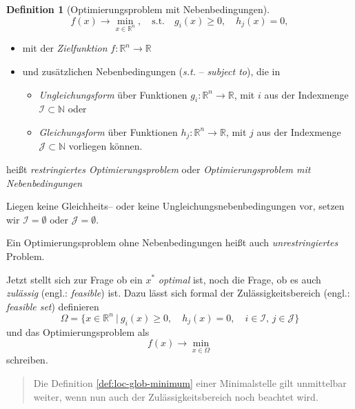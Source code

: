 \documentclass[]{book}
\providecommand{\tightlist}{%
  \setlength{\itemsep}{0pt}\setlength{\parskip}{0pt}}
\newenvironment {JHSAYS} [0] {\begin{quote}\color{jhsc}} {\end{quote}}
\theoremstyle{definition}
\newtheorem{definition}{Definition}[chapter]
\theoremstyle{definition}
\theoremstyle{definition}
\theoremstyle{definition}
\theoremstyle{remark}
\begin{document}
\begin{definition}[Optimierungsproblem mit Nebenbedingungen]
\begin{equation*}
f(x) \to \min_{x\in \mathbb R^{n}}, \quad \text{s.t.} \quad g_i(x)\geq 0, \quad h_j(x) = 0,
\end{equation*}

\begin{itemize}
\item
  mit der \emph{Zielfunktion} \(f\colon \mathbb R^{n} \to \mathbb R^{}\)
\item
  und zusätzlichen Nebenbedingungen (\emph{s.t.} -- \emph{subject to}), die in

  \begin{itemize}
  \tightlist
  \item
    \emph{Ungleichungsform} über Funktionen \(g_i\colon \mathbb R^{n} \to \mathbb R\), mit \(i\) aus der Indexmenge \(\mathcal I \subset \mathbb N\) oder
  \item
    \emph{Gleichungsform} über Funktionen \(h_j\colon \mathbb R^{n} \to \mathbb R\), mit \(j\) aus der Indexmenge \(\mathcal J \subset \mathbb N\)
    vorliegen können.
  \end{itemize}
\end{itemize}

heißt \emph{restringiertes Optimierungsproblem} oder \emph{Optimierungsproblem mit Nebenbedingungen}

Liegen keine Gleichheits-- oder keine Ungleichungsnebenbedingungen vor, setzen wir \(\mathcal I = \emptyset\) oder \(\mathcal J = \emptyset\).

Ein Optimierungsproblem ohne Nebenbedingungen heißt auch \emph{unrestringiertes} Problem.
\end{definition}

Jetzt stellt sich zur Frage ob ein \(x^*\) \emph{optimal} ist, noch die Frage, ob es auch \emph{zulässig} (engl.: \emph{feasible}) ist. Dazu lässt sich formal der Zulässigkeitsbereich (engl.: \emph{feasible set}) definieren
\begin{equation*}
\Omega = \{x\in \mathbb R^{n} ~|~g_i(x)\geq 0, \quad h_j(x)=0, \quad i\in \mathcal I,\, j\in \mathcal J\}
\end{equation*}
und das Optimierungsproblem als
\begin{equation*}
f(x) \to \min_{x\in \Omega}
\end{equation*}
schreiben.

\leavevmode\hypertarget{constaints-domofdef}{}%
\begin{JHSAYS}
Die Definition \ref{def:loc-glob-minimum} einer Minimalstelle gilt unmittelbar weiter, wenn nun auch der Zulässigkeitsbereich noch beachtet wird.

\end{JHSAYS}
\end{document}

